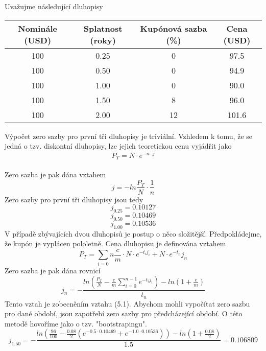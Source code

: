 \documentclass[a4paper]{book}
\begin{document}
Uvažujme následující dluhopisy
\begin{center}
\begin{tabular}{c c c c}
\textbf{Nominále (USD)} &
\multicolumn {1}{c}{\textbf{Splatnost (roky)}} & 
\multicolumn {1}{c}{\textbf{Kupónová sazba (\%)}} &
\multicolumn {1}{c}{\textbf{Cena (USD)}}\\
\hline
 100 & 0.25 & 0  & 97.5\\
 100 & 0.50 & 0  & 94.9\\
 100 & 1.00 & 0  & 90.0\\
 100 & 1.50 & 8  & 96.0\\
 100 & 2.00 & 12 & 101.6\\
\hline 
\end{tabular}
\end{center}
Výpočet zero sazby pro první tři dluhopisy je triviální. Vzhledem k tomu, že se jedná
o tzv. diskontní dluhopisy, lze jejich teoretickou cenu vyjádřit jako
\begin{equation*}
P_T = N \cdot e^{-n \cdot j}
\end{equation*}\\
Zero sazba je pak dána vztahem
\begin{equation}
j = - ln \frac {P_T}{N} \cdot \frac {1}{n}
\end{equation}
Zero sazby pro první tři dluhopisy jsou tedy
\begin{equation*}
j_{0.25} = 0.10127
\end{equation*}
\begin{equation*}
j_{0.50} = 0.10469
\end{equation*}
\begin{equation*}
j_{1.00} = 0.10536
\end{equation*}
V případě zbývajících dvou dluhopisů je postup o něco složitější. Předpokládejme, že kupón je vyplácen pololetně. Cena dluhopisu je definována vztahem
\begin{equation*}
P_T = \sum_{i = 0}{n} \frac {c}{m} \cdot N \cdot e^{-t_i j_i} + N \cdot e^{-t_n}{j_n}
\end{equation*}
Zero sazba je pak dána rovnicí
\begin{equation*}
j_n = -\frac{ln(\frac {P_T}{N}-\frac{c}{m} \sum_{i = 0}^{n-1}e^{-t_i j_i}) - ln (1 + \frac{c}{m})}{t_n}
\end{equation*}
Tento vztah je zobecněním vztahu (5.1). Abychom mohli vypočítat zero sazbu pro dané období, jsou zapotřebí zero sazby pro předcházející období. O této metodě hovoříme jako o tzv. "bootstrapingu".
\begin{equation*}
j_{1.50} = -\frac{ln(\frac {96}{100}-\frac{0.08}{2}(e^{-0.5 \cdot 0.10469} + e^{-1.0 \cdot 0.10536})) - ln (1 + \frac{0.08}{2})}{1.5} = 0.106809
\end{equation*}
\end{document}
